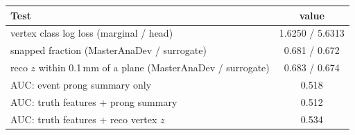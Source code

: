 \begin{tabular}{lc}
\toprule
Test & value \\
\midrule
vertex class log loss (marginal / head) & 1.6250 / 5.6313 \\
snapped fraction (MasterAnaDev / surrogate) & 0.681 / 0.672 \\
reco $z$ within 0.1\,mm of a plane (MasterAnaDev / surrogate) & 0.683 / 0.674 \\
\midrule
AUC: event prong summary only & 0.518 \\
AUC: truth features + prong summary & 0.512 \\
AUC: truth features + reco vertex $z$ & 0.534 \\
\bottomrule
\end{tabular}
